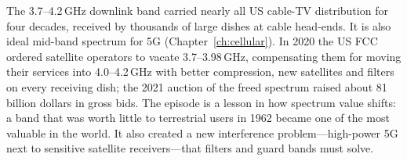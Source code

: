\begin{inpractice}
The 3.7--4.2\,GHz downlink band carried nearly all US cable-TV distribution for four decades,
received by thousands of large dishes at cable head-ends. It is also ideal mid-band spectrum for
5G (Chapter~\ref{ch:cellular}). In 2020 the US FCC ordered satellite operators to vacate
3.7--3.98\,GHz, compensating them for moving their services into 4.0--4.2\,GHz with better
compression, new satellites and filters on every receiving dish; the 2021 auction of the freed
spectrum raised about 81 billion dollars in gross bids. The episode is a lesson in how spectrum
value shifts: a band that was worth little to terrestrial users in 1962 became one of the most
valuable in the world. It also created a new interference problem---high-power 5G next to
sensitive satellite receivers---that filters and guard bands must solve.
\end{inpractice}


